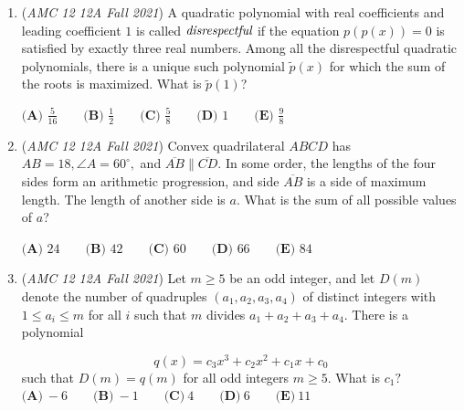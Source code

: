 \begin{enumerate}
 $\textbf{(A) } 36 \qquad\textbf{(B) } 112 \qquad\textbf{(C) } 120 \qquad\textbf{(D) } 148 \qquad\textbf{(E) } 160$


	\item (\textit{AMC 12 12A Fall 2021}) A quadratic polynomial with real coefficients and leading coefficient $1$ is called $\emph{disrespectful}$ if the equation $p(p(x))=0$ is satisfied by exactly three real numbers. Among all the disrespectful quadratic polynomials, there is a unique such polynomial $\tilde{p}(x)$ for which the sum of the roots is maximized. What is $\tilde{p}(1)$?


 $\textbf{(A) } \frac{5}{16} \qquad\textbf{(B) } \frac{1}{2} \qquad\textbf{(C) } \frac{5}{8} \qquad\textbf{(D) } 1 \qquad\textbf{(E) } \frac{9}{8}$


	\item (\textit{AMC 12 12A Fall 2021}) Convex quadrilateral $ABCD$ has $AB = 18, \angle{A} = 60^\circ,$ and $\overline{AB} \parallel \overline{CD}.$ In some order, the lengths of the four sides form an arithmetic progression, and side $\overline{AB}$ is a side of maximum length. The length of another side is $a.$ What is the sum of all possible values of $a$?


 $\textbf{(A) } 24 \qquad \textbf{(B) } 42 \qquad \textbf{(C) } 60 \qquad \textbf{(D) } 66 \qquad \textbf{(E) } 84$


	\item (\textit{AMC 12 12A Fall 2021}) Let $m\ge 5$ be an odd integer, and let $D(m)$ denote the number of quadruples $(a_1, a_2, a_3, a_4)$ of distinct integers with $1\le a_i \le m$ for all $i$ such that $m$ divides $a_1+a_2+a_3+a_4$. There is a polynomial

 \[q(x) = c_3x^3+c_2x^2+c_1x+c_0\]such that $D(m) = q(m)$ for all odd integers $m\ge 5$. What is $c_1?$
$\textbf{(A)}\ {-}6\qquad\textbf{(B)}\ {-}1\qquad\textbf{(C)}\ 4\qquad\textbf{(D)}\ 6\qquad\textbf{(E)}\ 11$


\end{enumerate}